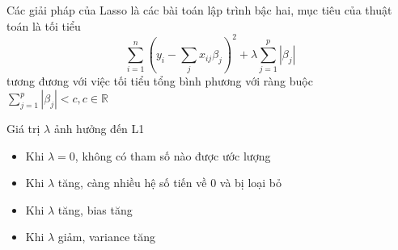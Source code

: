 \documentclass{article}
\begin{document}
	Các giải pháp của Lasso là các bài toán lập trình bậc hai, mục tiêu của thuật toán là tối tiểu 
	$$\sum_{i=1}^{n}\left(y_i - \sum_{j}x_{ij}\beta_j\right)^2 + \lambda\sum_{j=1}^p|\beta_j|$$
	tương đương với việc tối tiểu tổng bình phương với ràng buộc $\sum_{j=1}^p|\beta_j| < c, c \in \mathbb{R}$
	
	Giá trị $\lambda$ ảnh hưởng đến L1
	\begin{itemize}
		\item Khi $\lambda = 0$, không có tham số nào được ước lượng
		\item Khi $\lambda$ tăng, càng nhiều hệ số tiến về 0 và bị loại bỏ
		\item Khi $\lambda$ tăng, bias tăng
		\item Khi $\lambda$ giảm, variance tăng
	\end{itemize}
	
\end{document}
